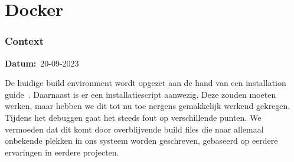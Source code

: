 \documentclass[a4paper]{report}
\newcommand{\teambox}{
  \begin{tcolorbox}[hbox, colback=blue!5!white,colframe=blue!75!black,
    left=.1mm, right=.1mm, top=.1mm, bottom=.1mm, fontupper=\scriptsize\sffamily]
    Team Keuze
  \end{tcolorbox}
}
\newcommand{\teamchoice}[1]{
  \section[ #1 ]{#1~\mbox{\raisebox{-2.5pt}{\teambox}}}
}
\newcommand{\timestamp}[1]{
  \mbox{\scriptsize \textbf{Datum:} #1} \smallbreak
}
\begin{document}



\teamchoice{Docker}
\subsubsection{Context}
\timestamp{20-09-2023}
De huidige build environment wordt opgezet aan de hand van een installation guide~\cite{fairphonegithub}.
Daarnaast is er een installatiescript aanwezig.
Deze zouden moeten werken, maar hebben we dit tot nu toe nergens gemakkelijk werkend gekregen.
Tijdens het debuggen gaat het steeds fout op verschillende punten. 
We vermoeden dat dit komt door overblijvende build files die naar allemaal onbekende plekken in ons systeem worden geschreven, gebaseerd op eerdere ervaringen in eerdere projecten.
\end{document}
